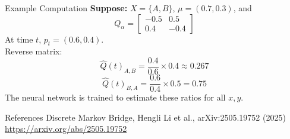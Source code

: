 \documentclass{beamer}
\begin{document}
\begin{frame}{Example Computation}
  \textbf{Suppose:} $X = \{A, B\}$, $\mu = (0.7, 0.3)$, and
  \[
    Q_\alpha = \begin{bmatrix} -0.5 & 0.5 \\ 0.4 & -0.4 \end{bmatrix}
  \]
  At time $t$, $p_t = (0.6, 0.4)$.\\[1em]
  Reverse matrix:
  \[
    \hat{Q}(t)_{A,B} = \frac{0.4}{0.6} \times 0.4 \approx 0.267
  \]
  \[
    \hat{Q}(t)_{B,A} = \frac{0.6}{0.4} \times 0.5 = 0.75
  \]
  The neural network is trained to estimate these ratios for all $x, y$.
\end{frame}

\begin{frame}{References}
  Discrete Markov Bridge, Hengli Li et al., arXiv:2505.19752 (2025)\\
  \url{https://arxiv.org/abs/2505.19752}
\end{frame}
\end{document}
